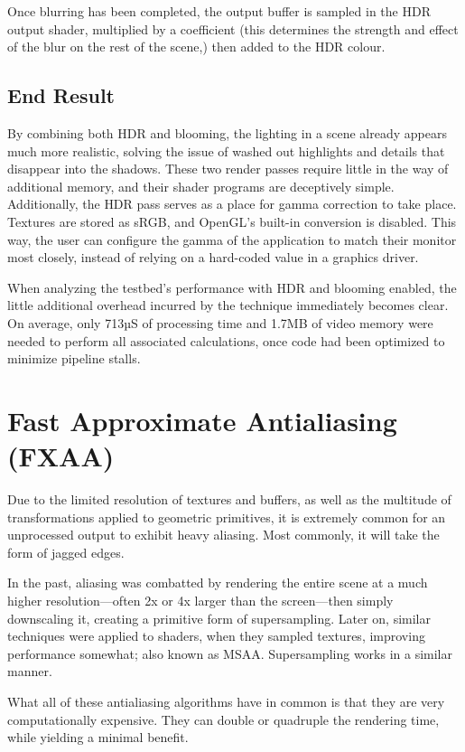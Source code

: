 \documentclass[11pt, oneside]{report}
\begin{document}
Once blurring has been completed, the output buffer is sampled in the \gls{HDR} output shader, multiplied by a coefficient (this determines the strength and effect of the blur on the rest of the scene,) then added to the \gls{HDR} colour.

\section{End Result}
By combining both \gls{HDR} and blooming, the lighting in a scene already appears much more realistic, solving the issue of washed out highlights and details that disappear into the shadows. These two render passes require little in the way of additional memory, and their \gls{shader} programs are deceptively simple. Additionally, the \gls{HDR} pass serves as a place for gamma correction to take place. Textures are stored as sRGB, and \gls{OpenGL}'s built-in conversion is disabled. This way, the user can configure the gamma of the application to match their monitor most closely, instead of relying on a hard-coded value in a graphics driver.

When analyzing the testbed's performance with \gls{HDR} and blooming enabled, the little additional overhead incurred by the technique immediately becomes clear. On average, only 713µS of processing time and 1.7MB of video memory were needed to perform all associated calculations, once code had been optimized to minimize \glspl{pipeline stall}.

\chapter{Fast Approximate Antialiasing (FXAA)}
Due to the limited resolution of textures and buffers, as well as the multitude of transformations applied to geometric primitives, it is extremely common for an unprocessed output to exhibit heavy \gls{aliasing}. Most commonly, it will take the form of jagged edges.

In the past, aliasing was combatted by rendering the entire scene at a much higher resolution---often 2x or 4x larger than the screen---then simply downscaling it, creating a primitive form of supersampling. Later on, similar techniques were applied to \glspl{shader}, when they sampled textures, improving performance somewhat; also known as MSAA. Supersampling works in a similar manner.

What all of these antialiasing algorithms have in common is that they are very computationally expensive. They can double or quadruple the rendering time, while yielding a minimal benefit.
\end{document}
